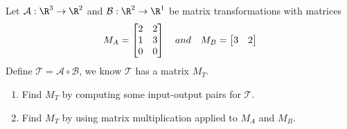 \begin{exercises}
\begin{problist}
		\prob Let $\mathcal A: \R^3 \to \R^2$ and $\mathcal B: \R^2 \to \R^1$ be matrix transformations with matrices
		\[
		    M_A = \mat{2&2\\1&3\\0&0} \quad and \quad M_B = \mat{3&2}
		\]
		Define $\mathcal T = \mathcal A \circ \mathcal B$, we know $\mathcal T$ has a matrix $M_T$. 
		\begin{enumerate}
		    \item Find $M_T$ by computing some input-output pairs for $\mathcal T$.
		    \item Find $M_T$ by using matrix multiplication applied to $M_A$ and $M_B$. 
		\end{enumerate}
		\end{problist}
\end{exercises}
